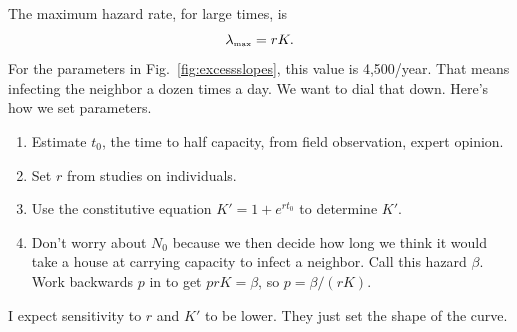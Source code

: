 \documentclass{article}
\begin{document}
The maximum hazard rate, for large times, is
\begin{equation}
  \lambda_{\mbox{\tiny max}}=rK.
\end{equation}
For the parameters in Fig.~\ref{fig:excessslopes}, this value is
4,500/year. That means infecting the neighbor a dozen times a day.
We want to dial that down.
Here's how we set parameters.
\begin{enumerate}
  \item Estimate $t_0$, the time to half capacity, from field
        observation, expert opinion.
  \item Set $r$ from studies on individuals.
  \item Use the constitutive equation $K'=1+e^{rt_0}$ to
        determine $K'$.
  \item Don't worry about $N_0$ because we then decide
        how long we think it would take a house at carrying
        capacity to infect a neighbor. Call this hazard
        $\beta$. Work backwards $p$ in
        to get $prK=\beta$, so $p=\beta/(rK)$.
\end{enumerate}
I expect sensitivity to $r$ and $K'$ to be lower. They
just set the shape of the curve.
\end{document}
